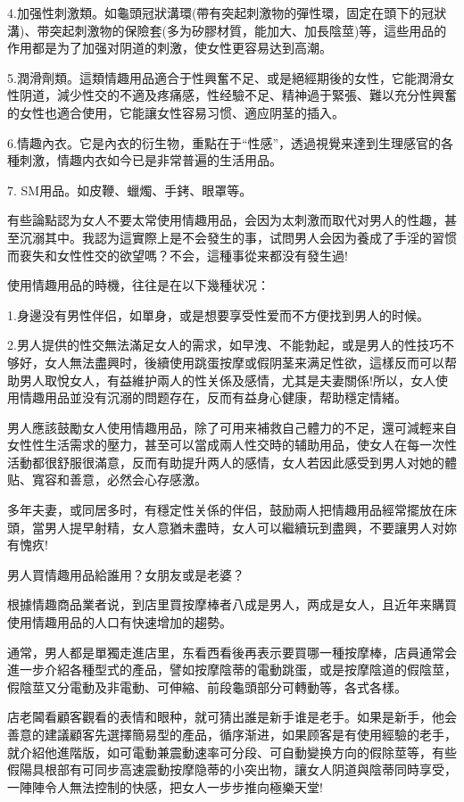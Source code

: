 \documentclass[12pt,UTF8]{ctexbook}
\begin{document}
4.加强性刺激類。如龜頭冠狀溝環(帶有突起刺激物的彈性環，固定在頭下的冠狀溝)、带突起刺激物的保險套(多为矽膠材質，能加大、加長陰莖)等，這些用品的作用都是为了加强对阴道的刺激，使女性更容易达到高潮。

5.潤滑劑類。這類情趣用品適合于性興奮不足、或是絕經期後的女性，它能潤滑女性阴道，減少性交的不適及疼痛感，性经驗不足、精神過于緊張、難以充分性興奮的女性也適合使用，它能讓女性容易习惯、適应阴茎的插入。

6.情趣內衣。它是內衣的衍生物，重點在于“性感”，透過視覺来達到生理感官的各種刺激，情趣内衣如今已是非常普遍的生活用品。

7. SM用品。如皮鞭、蠟燭、手銬、眼罩等。

有些論點認为女人不要太常使用情趣用品，会因为太刺激而取代对男人的性趣，甚至沉溺其中。我認为這實際上是不会發生的事，试問男人会因为養成了手淫的習惯而裵失和女性性交的欲望嗎？不会，這種事從来都没有發生過!

使用情趣用品的時機，往往是在以下幾種状况：

1.身邊没有男性伴侣，如單身，或是想要享受性爱而不方便找到男人的时候。

2.男人提供的性交無法滿足女人的需求，如早洩、不能勃起，或是男人的性技巧不够好，女人無法盡興时，後續使用跳蛋按摩或假阴茎来满足性欲，這樣反而可以帮助男人取悅女人，有益維护兩人的性关係及感情，尤其是夫妻關係!所以，女人使用情趣用品並没有沉溺的問题存在，反而有益身心健康，帮助穩定情緒。

男人應該鼓勵女人使用情趣用品，除了可用来補救自己體力的不足，還可減輕来自女性性生活需求的壓力，甚至可以當成兩人性交時的辅助用品，使女人在每一次性活動都很舒服很滿意，反而有助提升两人的感情，女人若因此感受到男人对她的體贴、寬容和善意，必然会心存感激。

多年夫妻，或同居多时，有穩定性关係的伴侣，鼓励兩人把情趣用品經常擺放在床頭，當男人提早射精，女人意猶未盡時，女人可以繼續玩到盡興，不要讓男人对妳有愧疚!

男人買情趣用品給誰用？女朋友或是老婆？

根據情趣商品業者说，到店里買按摩棒者八成是男人，两成是女人，且近年来購買使用情趣用品的人口有快速增加的趨勢。

通常，男人都是單獨走進店里，东看西看後再表示要買哪一種按摩棒，店員通常会進一步介紹各種型式的產品，譬如按摩陰蒂的電動跳蛋，或是按摩陰道的假陰莖，假陰莖又分電動及非電動、可伸縮、前段龜頭部分可轉動等，各式各樣。

店老閪看顧客觀看的表情和眼种，就可猜出誰是新手谁是老手。如果是新手，他会善意的建議顧客先選擇簡易型的產品，循序渐进，如果顾客是有使用經驗的老手，就介紹他進階版，如可電動兼震動速率可分段、可自動變换方向的假除莖等，有些假陽具根部有可同步高速震動按摩隐蒂的小突出物，讓女人阴道與陰蒂同時享受，一陣陣令人無法控制的快感，把女人一步步推向極樂天堂!
\end{document}
